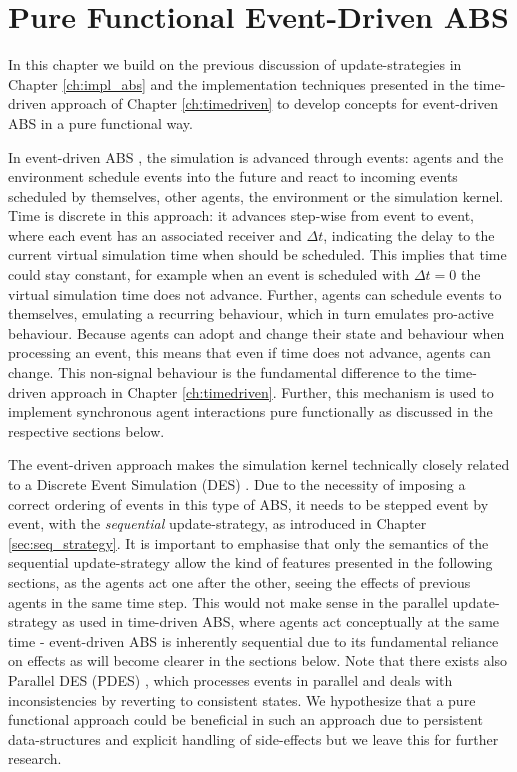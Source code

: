 \chapter{Pure Functional Event-Driven ABS}
\label{ch:eventdriven}

In this chapter we build on the previous discussion of update-strategies in Chapter \ref{ch:impl_abs} and the implementation techniques presented in the time-driven approach of Chapter \ref{ch:timedriven} to develop concepts for event-driven ABS in a pure functional way. 

\medskip

In event-driven ABS \cite{meyer_event-driven_2014}, the simulation is advanced through events: agents and the environment schedule events into the future and react to incoming events scheduled by themselves, other agents, the environment or the simulation kernel. Time is discrete in this approach: it advances step-wise from event to event, where each event has an associated receiver and $\Delta t$, indicating the delay to the current virtual simulation time when should be scheduled. This implies that time could stay constant, for example when an event is scheduled with $\Delta t = 0$ the virtual simulation time does not advance. Further, agents can schedule events to themselves, emulating a recurring behaviour, which in turn emulates pro-active behaviour. Because agents can adopt and change their state and behaviour when processing an event, this means that even if time does not advance, agents can change. This non-signal behaviour is the fundamental difference to the time-driven approach in Chapter \ref{ch:timedriven}. Further, this mechanism is used to implement synchronous agent interactions pure functionally as discussed in the respective sections below.

The event-driven approach makes the simulation kernel technically closely related to a Discrete Event Simulation (DES) \cite{zeigler_theory_2000}. Due to the necessity of imposing a correct ordering of events in this type of ABS, it needs to be stepped event by event, with the \textit{sequential} update-strategy, as introduced in Chapter \ref{sec:seq_strategy}. It is important to emphasise that only the semantics of the sequential update-strategy allow the kind of features  presented in the following sections, as the agents act one after the other, seeing the effects of previous agents in the same time step. This would not make sense in the parallel update-strategy as used in time-driven ABS, where agents act conceptually at the same time - event-driven ABS is inherently sequential due to its fundamental reliance on effects as will become clearer in the sections below. Note that there exists also Parallel DES (PDES) \cite{fujimoto_parallel_1990}, which processes events in parallel and deals with inconsistencies by reverting to consistent states. We hypothesize that a pure functional approach could be beneficial in such an approach due to persistent data-structures and explicit handling of side-effects but we leave this for further research.

